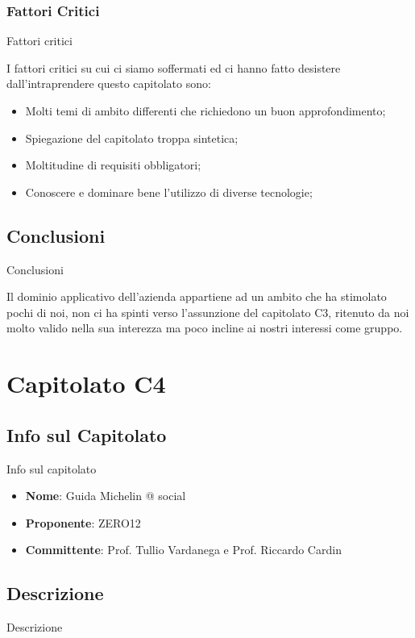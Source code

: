 \documentclass[11pt]{article}
\begin{document}
    \subsubsection{Fattori Critici} Fattori critici
    
    I fattori critici su cui ci siamo soffermati ed ci hanno fatto desistere dall'intraprendere questo capitolato sono:
    \begin{itemize}
            \item Molti temi di ambito differenti che richiedono un buon approfondimento;
            \item Spiegazione del capitolato troppa sintetica; 
            \item Moltitudine di requisiti obbligatori;
            \item Conoscere e dominare bene l'utilizzo di diverse tecnologie;
        \end{itemize}
    \subsection{Conclusioni} Conclusioni
    
    Il dominio applicativo dell'azienda appartiene ad un ambito che ha stimolato pochi di noi, non ci ha spinti verso l'assunzione del capitolato C3, ritenuto da noi molto valido nella sua interezza ma poco incline ai nostri interessi come gruppo.    
    
\newpage
    
\section{Capitolato C4}
    \subsection{Info sul Capitolato} Info sul capitolato
    \begin{itemize}
        \item \textbf{Nome}: Guida Michelin @ social
        \item \textbf{Proponente}: ZERO12
        \item \textbf{Committente}: Prof. Tullio Vardanega e Prof. Riccardo Cardin
    \end{itemize}
    \subsection{Descrizione} Descrizione
    
\end{document}

